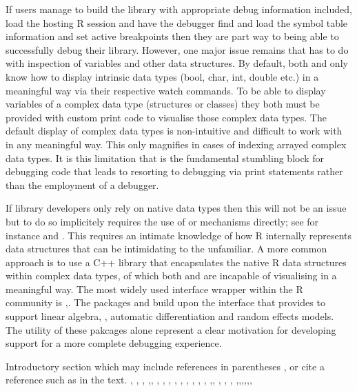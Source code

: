 If users manage to build the library with appropriate debug information included, load the hosting R session and have the debugger find and 
load the symbol table information and set active breakpoints then they are part way to being able to successfully debug their library. However, 
one major issue remains that has to do with inspection of variables and other data structures. By default, both  and  only 
know how to display intrinsic data types (bool, char, int, double etc.) in a meaningful way via their respective watch commands. To be able to 
display variables of a complex data type (structures or classes) they both must be provided with custom print code to visualise those complex 
data types. The default display of complex data types is non-intuitive and difficult to work with in any meaningful way. This only magnifies in 
cases of indexing arrayed complex data types. It is this limitation that is the fundamental stumbling block for debugging code that leads to 
resorting to debugging via print statements rather than the employment of a debugger. 

If library developers only rely on native data types then this will not be an issue but to do so implicitely
requires the use of  or  mechanisms directly; see for instance \citep{DotC} and \citep{DotC2}. This requires an intimate
knowledge of how R internally represents data structures that can be intimidating to the unfamiliar. A more common approach is to 
use a C++ library that encapsulates the native R data structures within complex data types, of which both  and  are  
incapable of visualising in a meaningful way. The most widely used interface wrapper within the R community is \citep{RcppIntro},\citep{Rcpp}. 
The packages  and  build upon the interface that  provides to support linear algebra\citep{RcppEigen}, 
\citep{RcppEigenLA}, automatic differentiation\citep{TMBlaplace} and random effects models\citep{TMB}. The utility of these pakcages alone
represent a clear motivation for developing support for a more complete debugging experience.

Introductory section which may include references in parentheses
\citep{R}, or cite a reference such as \citet{R} in the text. \citep{Rcpp}, \citep{RcppEigen}, \citep{TMB}, \citep{Rextensions}
\citep{DebuggingC_Cpp},\citep{DebuggingRandCcodeinR}, \citep{CodeLLDB-manual}, \citep{CodeLLDB}, \citep{VSCodeTipsTricks}, 
\citep{VSCodeDownload}, \citep{VSCodeCCppExt}, \citep{VSCodeCCpp}, \citep{GDB}, \citep{ModernDebugging}, \citep{DDD},
\citep{ImprovingCppDebug},\citep{UsingRtools}, \citep{RcppIntro}, \citep{ihaka:1996}, \citep{RcppEigenLA},
\citep{TMBlaplace},\citep{DotC},\citep{DotC2},\citep{deSolve},\citep{Routines},\citep{LLDB},
\citep{Xcode}


